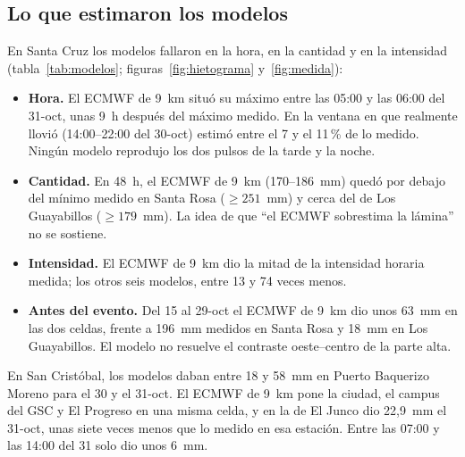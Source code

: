 \documentclass{sosg-informe}
\begin{document}
\subsection{Lo que estimaron los modelos}
En Santa Cruz los modelos fallaron en la hora, en la cantidad y en la intensidad (tabla~\ref{tab:modelos}; figuras~\ref{fig:hietograma} y~\ref{fig:medida}):
\begin{itemize}
  \item \textbf{Hora.} El ECMWF de 9~km situó su máximo entre las 05:00 y las 06:00 del 31-oct, unas 9~h después del máximo medido. En la ventana en que realmente llovió (14:00--22:00 del 30-oct) estimó entre el 7 y el 11\,\% de lo medido. Ningún modelo reprodujo los dos pulsos de la tarde y la noche.
  \item \textbf{Cantidad.} En 48~h, el ECMWF de 9~km (170--186~mm) quedó por debajo del mínimo medido en Santa Rosa ($\geq 251$~mm) y cerca del de Los Guayabillos ($\geq 179$~mm). La idea de que \enquote{el ECMWF sobrestima la lámina} no se sostiene.
  \item \textbf{Intensidad.} El ECMWF de 9~km dio la mitad de la intensidad horaria medida; los otros seis modelos, entre 13 y 74 veces menos.
  \item \textbf{Antes del evento.} Del 15 al 29-oct el ECMWF de 9~km dio unos 63~mm en las dos celdas, frente a 196~mm medidos en Santa Rosa y 18~mm en Los Guayabillos. El modelo no resuelve el contraste oeste--centro de la parte alta.
\end{itemize}
En San Cristóbal, los modelos daban entre 18 y 58~mm en Puerto Baquerizo Moreno para el 30 y el 31-oct. El ECMWF de 9~km pone la ciudad, el campus del GSC y El Progreso en una misma celda, y en la de El Junco dio 22,9~mm el 31-oct, unas siete veces menos que lo medido en esa estación. Entre las 07:00 y las 14:00 del 31 solo dio unos 6~mm.
\end{document}
